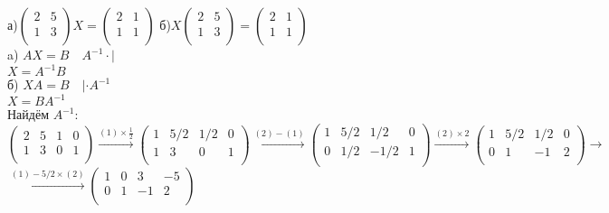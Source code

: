 а)$\begin{pmatrix}
2 & 5\\
1 & 3\\
\end{pmatrix}
X=
\begin{pmatrix}
2 & 1\\
1 & 1\\
\end{pmatrix}
$
\qquad б)$X
\begin{pmatrix}
2 & 5\\
1 & 3\\
\end{pmatrix}
=
\begin{pmatrix}
2 & 1\\
1 & 1\\
\end{pmatrix}
$\vspace{1mm}\\
a) $AX=B\quad A^{-1}\cdot |$\\
$X=A^{-1}B$\\
б) $XA=B\quad |\cdot A^{-1}$\\
$X=BA^{-1}$\\
Найдём $A^{-1}$:\vspace{2mm}\\
$\left( \begin{array}{cc|cc}
2 & 5 & 1 & 0\\
1 & 3 & 0 & 1\\
\end{array} \right)
\xrightarrow{(1)\times \frac{1}{2}}
\left( \begin{array}{cc|cc}
1 & 5/2 & 1/2 & 0\\
1 & 3 & 0 & 1\\
\end{array} \right)
\xrightarrow{(2)-(1)}
\left( \begin{array}{cc|cc}
1 & 5/2 & 1/2 & 0\\
0 & 1/2 & -1/2 & 1\\
\end{array} \right)
\xrightarrow{(2)\times 2}
\left( \begin{array}{cc|cc}
1 & 5/2 & 1/2 & 0\\
0 & 1 & -1 & 2\\
\end{array} \right)\rightarrow
$\vspace{5mm}
$
\xrightarrow{(1)-5/2\times(2)}
\left( \begin{array}{cc|cc}
1 & 0 & 3 & -5\\
0 & 1 & -1 & 2\\
\end{array} \right)
$\vspace{2mm}

